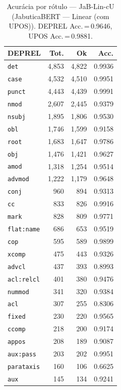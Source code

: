 \begin{table}[ht]
\centering
\caption{Acurácia por rótulo --- JaB-Lin-cU (JabuticaBERT — Linear (com UPOS)). DEPREL Acc.\,=\,0.9646, UPOS Acc.\,=\,0.9881.}
\label{tab:acc-predict-test-df-jabuticabert-linear}
\begin{minipage}[t]{0.55\linewidth}
\centering\scriptsize
\begin{tabular}{lrrr}
\toprule
\textbf{DEPREL} & \textbf{Tot.} & \textbf{Ok} & \textbf{Acc.} \\
\midrule
\texttt{det} & 4,853 & 4,822 & 0.9936 \\
\texttt{case} & 4,532 & 4,510 & 0.9951 \\
\texttt{punct} & 4,443 & 4,439 & 0.9991 \\
\texttt{nmod} & 2,607 & 2,445 & 0.9379 \\
\texttt{nsubj} & 1,895 & 1,806 & 0.9530 \\
\texttt{obl} & 1,746 & 1,599 & 0.9158 \\
\texttt{root} & 1,683 & 1,647 & 0.9786 \\
\texttt{obj} & 1,476 & 1,421 & 0.9627 \\
\texttt{amod} & 1,318 & 1,254 & 0.9514 \\
\texttt{advmod} & 1,222 & 1,179 & 0.9648 \\
\texttt{conj} & 960 & 894 & 0.9313 \\
\texttt{cc} & 833 & 826 & 0.9916 \\
\texttt{mark} & 828 & 809 & 0.9771 \\
\texttt{flat\!:\!name} & 686 & 653 & 0.9519 \\
\texttt{cop} & 595 & 589 & 0.9899 \\
\texttt{xcomp} & 475 & 443 & 0.9326 \\
\texttt{advcl} & 437 & 393 & 0.8993 \\
\texttt{acl\!:\!relcl} & 401 & 380 & 0.9476 \\
\texttt{nummod} & 341 & 320 & 0.9384 \\
\texttt{acl} & 307 & 255 & 0.8306 \\
\texttt{fixed} & 230 & 220 & 0.9565 \\
\texttt{ccomp} & 218 & 200 & 0.9174 \\
\texttt{appos} & 208 & 189 & 0.9087 \\
\texttt{aux\!:\!pass} & 203 & 202 & 0.9951 \\
\texttt{parataxis} & 160 & 106 & 0.6625 \\
\texttt{aux} & 145 & 134 & 0.9241 \\

\end{tabular}
\end{minipage}
\end{table}

